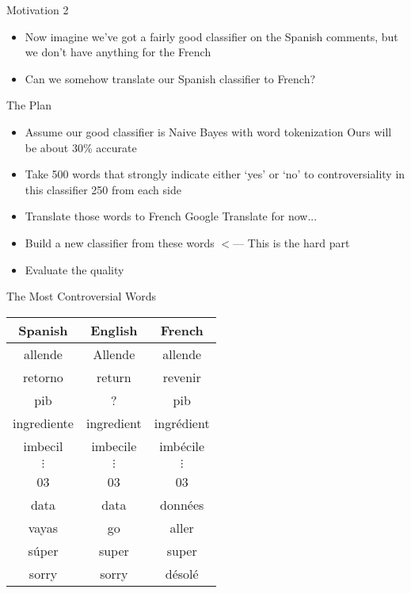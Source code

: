 \documentclass{beamer}
\begin{document}
\begin{frame}{Motivation 2}
\begin{itemize}
\item Now imagine we've got a fairly good classifier on the Spanish comments, but we don't have anything for the French
\item Can we somehow translate our Spanish classifier to French?
\end{itemize}
\end{frame}

\begin{frame}{The Plan}
\begin{itemize}
\item Assume our good classifier is Naive Bayes with word tokenization
Ours will be about 30\% accurate
\item Take 500 words that strongly indicate either `yes' or `no' to controversiality in this classifier
250 from each side
\item Translate those words to French
Google Translate for now...
\item Build a new classifier from these words $<$--- This is the hard part
\item Evaluate the quality
\end{itemize}
\end{frame}

\begin{frame}{The Most Controversial Words}
\begin{center}
\begin{tabular}{|c|c|c|}
\rowcolor{gray!50}Spanish & English & French \\\hline
allende & Allende & allende \\
retorno & return & revenir \\
pib & ? & pib \\
ingrediente & ingredient & ingrédient \\
imbecil & imbecile & imbécile \\
$\vdots$ & $\vdots$ & $\vdots$ \\
03 & 03 & 03 \\
data & data & données \\
vayas & go & aller \\
súper & super & super \\
sorry & sorry & désolé \\
\end{tabular}
\end{center}
\end{frame}
\end{document}
